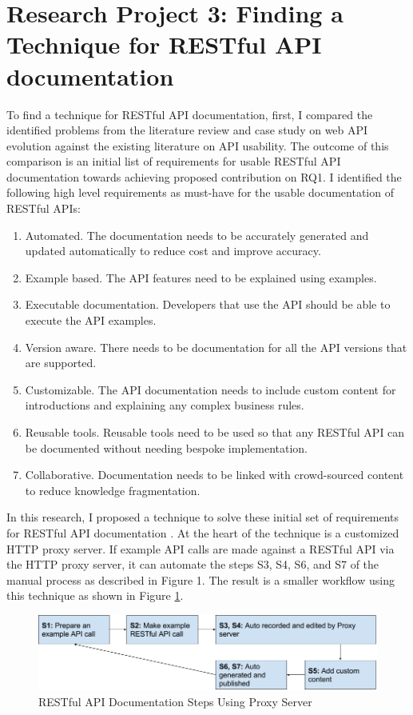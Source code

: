 \documentclass[11pt,oneside]{book}
\begin{document}
\section{Research Project 3: Finding a Technique for RESTful API documentation}

To find a technique for RESTful API documentation, first, I compared the identified problems from the literature review and case study on web API evolution against the existing literature on API usability. The outcome of this comparison is an initial list of requirements for usable RESTful API documentation towards achieving proposed contribution on RQ1. I identified the following high level requirements as must-have for the usable documentation of RESTful APIs:

\begin{enumerate}[label=\textbf{R\arabic*}]
  \item Automated. The documentation needs to be accurately generated and updated automatically to reduce cost and improve accuracy.
  \item Example based. The API features need to be explained using examples.
\item   Executable documentation. Developers that use the API should be able to execute the API examples.
\item   Version aware. There needs to be documentation for all the API versions that are supported.
\item   Customizable. The API documentation needs to include custom content for introductions and explaining any complex business rules.
\item   Reusable tools. Reusable tools need to be used so that any RESTful API can be documented without needing bespoke implementation.
\item   Collaborative. Documentation needs to be linked with crowd-sourced content to reduce knowledge fragmentation.
\end{enumerate}

In this research, I proposed a technique to solve these initial set of requirements for RESTful API documentation \cite{sohan2015spyrest}. At the heart of the technique is a customized HTTP proxy server. If example API calls are made against a RESTful API via the HTTP proxy server, it can automate the steps S3, S4, S6, and S7 of the manual process as described in Figure 1. The result is a smaller workflow using this technique as shown in Figure \ref{fig:proxy_workflow}.

\begin{figure}[bth]
  \includegraphics[width=\linewidth]{proxy_workflow.png}
  \caption{RESTful API Documentation Steps Using Proxy Server}
  \label{fig:proxy_workflow}
\end{figure}
\end{document}
